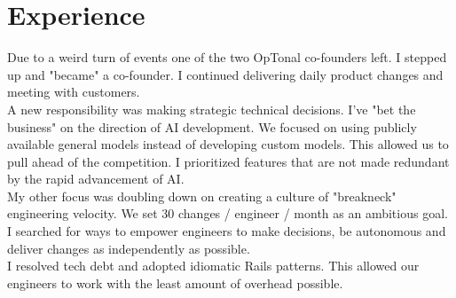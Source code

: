 \documentclass[]{matija-resume}
\begin{document}
\begin{minipage}[t]{1.0\textwidth}


\section{Experience}

\vspace{\topsep}
Due to a weird turn of events one of the two OpTonal co-founders left. I stepped up and "became" a co-founder. I continued delivering daily product changes and meeting with customers.\\
\vspace{\topsep}
A new responsibility was making strategic technical decisions. I've "bet the business" on the direction of AI development. We focused on using publicly available general models instead of  developing custom models. This allowed us to pull ahead of the competition. I prioritized features that are not made redundant by the rapid advancement of AI.\\
\vspace{\topsep}
My other focus was doubling down on creating a culture of "breakneck" engineering velocity. We set 30 changes / engineer / month as an ambitious goal. I searched for ways to empower engineers to make decisions, be autonomous and deliver changes as independently as possible.\\
\vspace{\topsep}
I resolved tech debt and adopted idiomatic Rails patterns. This allowed our engineers to work with the least amount of overhead possible.
\vspace{\topsep}

\sectionsep


\end{minipage}
\end{document}
